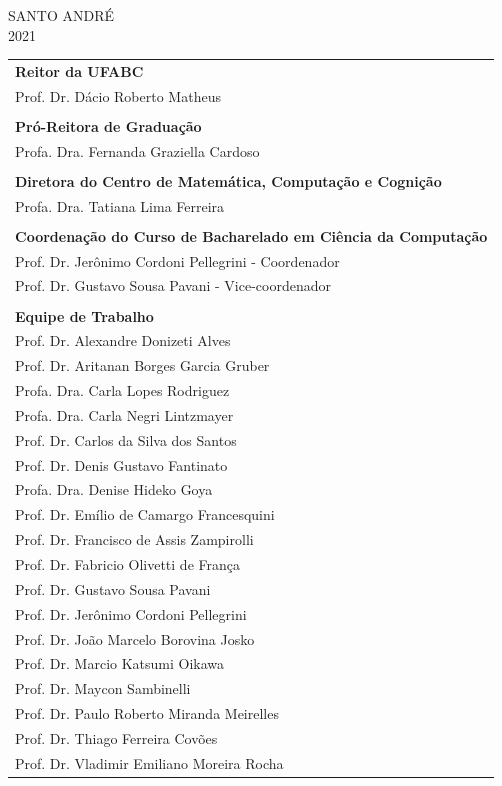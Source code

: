 \documentclass{article}
\begin{document}
\begin{center}
    SANTO ANDRÉ \\ 2021
\end{center}

\newpage

\begin{tabular}{l}
\textbf{Reitor da UFABC}\\
Prof. Dr. Dácio Roberto Matheus\\
\\
\textbf{Pró-Reitora de Graduação}\\
Profa. Dra. Fernanda Graziella Cardoso\\
\\
\textbf{Diretora do Centro de Matemática, Computação e Cognição}\\
Profa. Dra. Tatiana Lima Ferreira\\
\\
\textbf{Coordenação do Curso de Bacharelado em Ciência da Computação}\\
Prof. Dr. Jerônimo Cordoni Pellegrini - Coordenador\\
Prof. Dr. Gustavo Sousa Pavani - Vice-coordenador\\
\\
\textbf{Equipe de Trabalho}\\
Prof. Dr. Alexandre Donizeti Alves\\
Prof. Dr. Aritanan Borges Garcia Gruber\\
Profa. Dra. Carla Lopes Rodriguez\\
Profa. Dra. Carla Negri Lintzmayer\\
Prof. Dr. Carlos da Silva dos Santos\\
Prof. Dr. Denis Gustavo Fantinato\\
Profa. Dra. Denise Hideko Goya\\
Prof. Dr. Emílio de Camargo Francesquini\\
Prof. Dr. Francisco de Assis Zampirolli\\
Prof. Dr. Fabricio Olivetti de França\\
Prof. Dr. Gustavo Sousa Pavani\\
Prof. Dr. Jerônimo Cordoni Pellegrini\\
Prof. Dr. João Marcelo Borovina Josko\\
Prof. Dr. Marcio Katsumi Oikawa\\
Prof. Dr. Maycon Sambinelli\\
Prof. Dr. Paulo Roberto Miranda Meirelles\\
Prof. Dr. Thiago Ferreira Covões\\
Prof. Dr. Vladimir Emiliano Moreira Rocha\\




\end{tabular}
\end{document}

